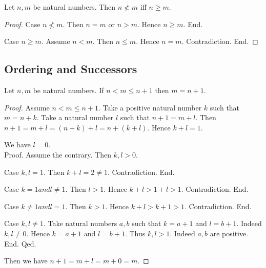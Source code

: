 \documentclass[10pt]{article}
\begin{document}
  \begin{forthel}
    \begin{proposition}[id=ARITHMETIC_04_6991525988794368,printid]
      Let $n, m$ be natural numbers.
      Then $n \nless m$ iff $n \geq m$.
    \end{proposition}
    \begin{proof}
      Case $n \nless m$.
        Then $n = m$ or $n > m$.
        Hence $n \geq m$.
      End.

      Case $n \geq m$.
        Assume $n < m$.
        Then $n \leq m$.
        Hence $n = m$.
        Contradiction.
      End.
    \end{proof}
  \end{forthel}


  \subsection*{Ordering and Successors}

  \begin{forthel}
    \begin{proposition}[id=ARITHMETIC_04_7006203091615744,printid]
      Let $n, m$ be natural numbers.
      If $n < m \leq n + 1$ then $m = n + 1$.
    \end{proposition}
    \begin{proof}
      Assume $n < m \leq n + 1$.
      Take a positive natural number $k$ such that $m = n + k$.
      Take a natural number $l$ such that $n + 1 = m + l$.
      Then $n + 1
        = m + l
        = (n + k) + l
        = n + (k + l)$.
      Hence $k + l = 1$.

      We have $l = 0$. \\
      Proof.
        Assume the contrary.
        Then $k,l > 0$.

        Case $k,l = 1$.
          Then $k + l
            = 2
            \neq 1$.
          Contradiction.
        End.

        Case $k = 1 and l \neq 1$.
          Then $l > 1$.
          Hence $k + l
            > 1 + l
            > 1$.
          Contradiction.
        End.

        Case $k \neq 1 and l = 1$.
          Then $k > 1$.
          Hence $k + l
            > k + 1
            > 1$.
          Contradiction.
        End.

        Case $k, l \neq 1$.
          Take natural numbers $a, b$ such that $k = a + 1$ and $l = b + 1$.
          Indeed $k, l \neq 0$.
          Hence $k = a + 1$ and $l = b + 1$.
          Thus $k, l > 1$. Indeed $a, b$ are positive.
        End.
      Qed.

      Then we have $n + 1
        = m + l
        = m + 0
        = m$.
    \end{proof}
  \end{forthel}
\end{document}
